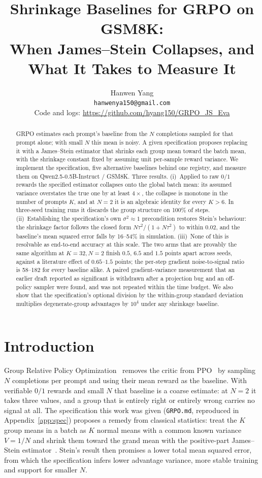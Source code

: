 \documentclass{article}
\title{Shrinkage Baselines for GRPO on GSM8K:\\
When James--Stein Collapses, and What It Takes to Measure It}
\author{Hanwen Yang\\
\texttt{hanwenya150@gmail.com}\\
Code and logs: \url{https://github.com/hyang150/GRPO_JS_Eva}
}
\begin{document}
\maketitle

\begin{abstract}
GRPO estimates each prompt's baseline from the $N$ completions sampled for
that prompt alone; with small $N$ this mean is noisy. A given specification
proposes replacing it with a James--Stein estimator that shrinks each group
mean toward the batch mean, with the shrinkage constant fixed by assuming
unit per-sample reward variance. We implement the specification, five
alternative baselines behind one registry, and measure them on
Qwen2.5-0.5B-Instruct / GSM8K. Three results. (i)~Applied to raw $0/1$
rewards the specified estimator collapses onto the global batch mean: its
assumed variance overstates the true one by at least $4\times$, the collapse
is monotone in the number of prompts $K$, and at $N=2$ it is an algebraic
identity for every $K>6$. In three-seed training runs it discards the group
structure on 100\% of steps. (ii)~Establishing the specification's own
$\sigma^2\approx1$ precondition restores Stein's behaviour: the shrinkage
factor follows the closed form $N\tau^2/(1+N\tau^2)$ to within $0.02$, and
the baseline's mean squared error falls by 16--54\% in simulation.
(iii)~None of this is resolvable as end-to-end accuracy at this scale. The
two arms that are provably the same algorithm at $K=32,N=2$ finish $0.5$,
$6.5$ and $1.5$ points apart across seeds, against a literature effect of
$0.65$--$1.5$ points; the per-step gradient noise-to-signal ratio is 58--182
for every baseline alike. A paired gradient-variance measurement that an
earlier draft reported as significant is withdrawn after a projection bug
and an off-policy sampler were found, and was not repeated within the time
budget. We also show that the specification's optional division by the
within-group standard deviation multiplies degenerate-group advantages by
$10^4$ under any shrinkage baseline.
\end{abstract}

\section{Introduction}

Group Relative Policy Optimization~\citep{shao2024deepseekmath} removes the
critic from PPO~\citep{schulman2017ppo} by sampling $N$ completions per prompt
and using their mean reward as the baseline. With verifiable $0/1$ rewards
and small $N$ that baseline is a coarse estimate: at $N=2$ it takes three
values, and a group that is entirely right or entirely wrong carries no
signal at all. The specification this work was given (\texttt{GRPO.md},
reproduced in Appendix~\ref{app:spec}) proposes a remedy from classical
statistics: treat the $K$ group means in a batch as $K$ normal means with a
common known variance $V=1/N$ and shrink them toward the grand mean with the
positive-part James--Stein estimator~\citep{james1961}. Stein's result then
promises a lower total mean squared error, from which the specification
infers lower advantage variance, more stable training and support for
smaller $N$.
\end{document}
